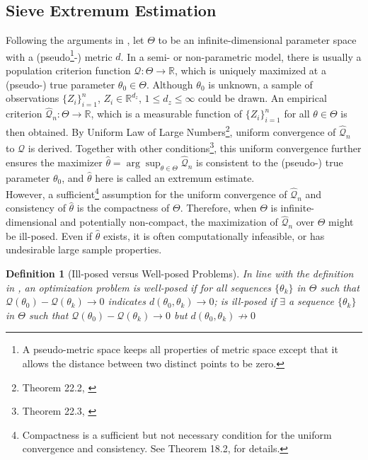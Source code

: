 \documentclass[12pt, a4paper]{article}
\theoremstyle{MAstyle} \newtheorem{assumption}{Assumption}[section]
\theoremstyle{MAstyle} \newtheorem{definition}{Definition}[section]
\theoremstyle{MAstyle} \newtheorem{theorem}{Theorem}[section]
\theoremstyle{MAstyle} \newtheorem{corollary}{Corollary}[section]
\begin{document}
        \subsection{Sieve Extremum Estimation}\label{sieve_extremum_estimation}
            Following the arguments in \cite{Chen_2007}, let $\mathit{\Theta}$ to be an infinite-dimensional parameter space with a (pseudo\footnote{A pseudo-metric space keeps all properties of metric space except that it allows the distance between two distinct points to be zero.}-) metric $d$. In a semi- or non-parametric model, there is usually a population criterion function $\mathcal{Q}:\mathit{\Theta} \rightarrow \mathbb{R}$, which is uniquely maximized at a (pseudo-) true parameter $\theta_0 \in \mathit{\Theta}$. Although $\theta_0$ is unknown, a sample of observations $\{Z_i\}_{i=1}^n$, $Z_i \in \mathbb{R}^{d_z}$, $1 \le d_z \le \infty$ could be drawn. An empirical criterion $\widehat{\mathcal{Q}}_n: \mathit{\Theta} \rightarrow \mathbb{R}$, which is a measurable function of $\{Z_i\}_{i=1}^n$ for all $\theta \in \mathit{\Theta}$ is then obtained. By Uniform Law of Large Numbers\footnote{Theorem 22.2, \cite{Hansen_2022}}, uniform convergence of $\widehat{\mathcal{Q}}_n$ to $\mathcal{Q}$ is derived. Together with other conditions\footnote{Theorem 22.3, \cite{Hansen_2022}}, this uniform convergence further ensures the maximizer $\hat{\theta}=\arg \sup_{\theta \in \Theta} \widehat{\mathcal{Q}}_n$ is consistent to the (pseudo-) true parameter $\theta_0$, and $\hat{\theta}$ here is called an extremum estimate.\\

            However, a sufficient\footnote{Compactness is a sufficient but not necessary condition for the uniform convergence and consistency. See Theorem 18.2, \cite{Hansen_probability_2022} for details.} assumption for the uniform convergence of $\widehat{\mathcal{Q}}_n$ and consistency of $\hat{\theta}$ is the compactness of $\mathit{\Theta}$. Therefore, when $\mathit{\Theta}$ is infinite-dimensional and potentially non-compact, the maximization of $\widehat{\mathcal{Q}}_n$ over $\mathit{\Theta}$ might be ill-posed. Even if $\hat{\theta}$ exists, it is often computationally infeasible, or has undesirable large sample properties.
            
            \begin{definition}[Ill-posed versus Well-posed Problems]\label{ill-posed_vs_well-posed}
                In line with the definition in \cite{Chen_2007}, an optimization problem is well-posed if for all sequences $\{\theta_k\}$ in $\mathit{\Theta}$ such that $\mathcal{Q}(\theta_0)-\mathcal{Q}(\theta_k)\rightarrow 0$ indicates $d(\theta_0, \theta_k) \rightarrow 0$; is ill-posed if $\exists$ a sequence $\{\theta_k\}$ in $\mathit{\Theta}$ such that $\mathcal{Q}(\theta_0)-\mathcal{Q}(\theta_k)\rightarrow 0$ but $d(\theta_0, \theta_k) \not\rightarrow 0$
            \end{definition}
            
\end{document}
